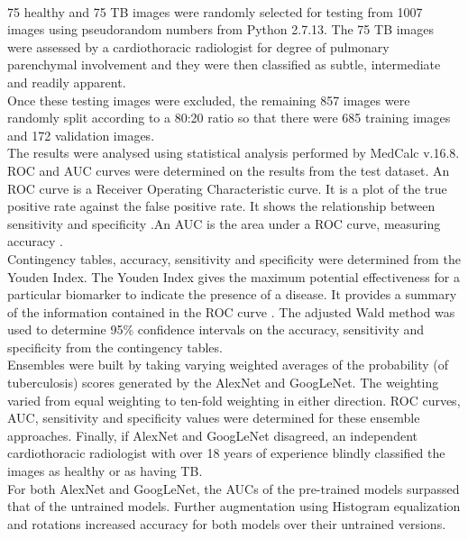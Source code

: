 \\
75 healthy and 75 TB images were randomly selected for testing from 1007 images using pseudorandom numbers from Python 2.7.13. The 75 TB images were assessed by a cardiothoracic radiologist for degree of pulmonary parenchymal involvement and they were then classified as subtle, intermediate and readily apparent.\newline
\\
Once these testing images were excluded, the remaining 857 images were randomly split according to a 80:20 ratio so that there were 685 training images and 172 validation images.\newline
\\
The results were analysed using statistical analysis performed by MedCalc v.16.8. ROC and AUC curves were determined on the results from the test dataset. An ROC curve is a Receiver Operating Characteristic curve. It is a plot of the true positive rate against the false positive rate. It shows the relationship between sensitivity and specificity \cite{24}.An AUC is the area under a ROC curve, measuring accuracy \cite{25}. \newline
\\
Contingency tables, accuracy, sensitivity and specificity were determined from the Youden Index. The Youden Index gives the maximum potential effectiveness for a particular biomarker to indicate the presence of a disease. It provides a summary of the information contained in the ROC curve \cite{26}. The adjusted Wald method was used to determine 95\% confidence intervals on the accuracy, sensitivity and specificity from the contingency tables. \newline
\\
Ensembles were built by taking varying weighted averages of the probability (of tuberculosis) scores generated by the AlexNet and GoogLeNet. The weighting varied from equal weighting to ten-fold weighting in either direction. ROC curves, AUC, sensitivity and specificity values were determined for these ensemble approaches. Finally, if AlexNet and GoogLeNet disagreed, an independent cardiothoracic radiologist with over 18 years of experience blindly classified the images as healthy or as having TB.\newline
\\
For both AlexNet and GoogLeNet, the AUCs of the pre-trained models surpassed that of the untrained models. Further augmentation using Histogram equalization and rotations increased accuracy for both models over their untrained versions.\newline
